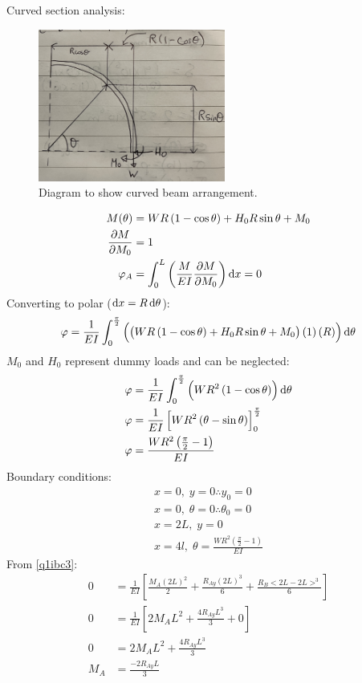 \documentclass[11pt]{article}
\numberwithin{equation}{section}
\begin{document}
Curved section analysis:
\begin{figure}[H]
    \centering
    \includegraphics[height = 5cm]{./img/q1ii.jpg}
    \caption{Diagram to show curved beam arrangement.}
    \label{fig:q1ii}
\end{figure}
\begin{align}
    M(\theta) &= WR\left(1 - \cos \theta\right) + H_0 R \sin\theta + M_0\\
    \frac{\partial M}{\partial M_0} &= 1\\
    \varphi_A &= \int_0^L \left(\frac{M}{EI}\frac{\partial M}{\partial M_0}\right)\dif x = 0
\end{align}
Converting to polar ($\dif x = R \dif \theta$):
\begin{align}
    \varphi = \frac{1}{EI}\int_0^{\frac{\pi}{2}} \left( \left(WR \left(1-\cos \theta\right)+H_0 R\sin\theta + M_0 \right)\left(1\right)\left(R\right) \right)\dif \theta
\end{align}
$M_0$ and $H_0$ represent dummy loads and can be neglected:
\begin{align}
    \varphi &= \frac{1}{EI}\int_0^{\frac{\pi}{2}} \left(WR^2\left(1-\cos\theta\right)\right)\dif \theta\\
    \varphi &= \frac{1}{EI} \left[WR^2\left(\theta-\sin\theta\right)\right]^{\frac{\pi}{2}}_0\\
    \varphi &= \frac{WR^2\left(\frac{\pi}{2}-1\right)}{EI}
\end{align}
Boundary conditions:
\begin{gather}
    x = 0, \; y = 0 \therefore y_0 = 0\\
    x = 0, \; \theta = 0 \therefore \theta_0 = 0\\
    x = 2L, \; y = 0 \label{q1ibc3}\\
    x = 4l, \; \theta = \frac{WR^2\left(\frac{\pi}{2}-1\right)}{EI} \label{q1ibc4}
\end{gather}
From \ref{q1ibc3}:
\begin{align}
    0 &= \frac{1}{EI} \left[\frac{M_A\left(2L\right)^2}{2} + \frac{R_{Ay}\left(2L\right)^3}{6} + \frac{R_B <2L - 2L>^3}{6}\right]\\
    0 &= \frac{1}{EI} \left[2M_A L^2 + \frac{4R_{Ay}L^3}{3} + 0\right]\\
    0 &= 2M_AL^2 + \frac{4R_{Ay}L^3}{3}\\
    M_A &= \frac{-2R_{Ay}L}{3} \label{q1iMA}
\end{align}
\end{document}
